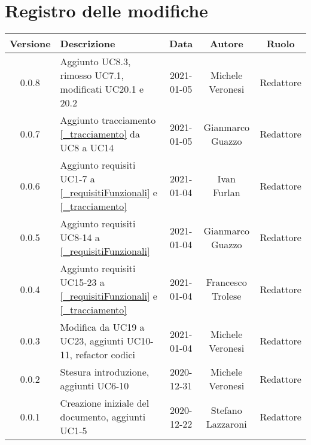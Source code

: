 \section*{Registro delle modifiche}

\begin{center}
	\begin{longtable}{|c|p{5cm}|c|c|c|}
	\hline
	\rowcolor{lighter-grayer}
	\textbf{Versione} & \textbf{Descrizione} & \textbf{Data} & \textbf{Autore} & \textbf{Ruolo} \\
	\hline
	\endfirsthead


	\hline
	0.0.8 & Aggiunto UC8.3, rimosso UC7.1, modificati UC20.1 e 20.2 & 2021-01-05 & Michele Veronesi & Redattore \\
	0.0.7 & Aggiunto tracciamento \ref{_tracciamento} da UC8 a UC14 & 2021-01-05 & Gianmarco Guazzo & Redattore \\
	0.0.6 & Aggiunto requisiti UC1-7 a \ref{_requisitiFunzionali} e \ref{_tracciamento} & 2021-01-04 & Ivan Furlan & Redattore \\
	0.0.5 & Aggiunto requisiti UC8-14 a \ref{_requisitiFunzionali} & 2021-01-04 & Gianmarco Guazzo & Redattore \\
	0.0.4 & Aggiunto requisiti UC15-23 a \ref{_requisitiFunzionali} e \ref{_tracciamento} & 2021-01-04 & Francesco Trolese & Redattore \\
	0.0.3 & Modifica da UC19 a UC23, aggiunti UC10-11, refactor codici & 2021-01-04 & Michele Veronesi & Redattore \\
	0.0.2 & Stesura introduzione, aggiunti UC6-10 & 2020-12-31 & Michele Veronesi & Redattore\\
    0.0.1 & Creazione iniziale del documento, aggiunti UC1-5 & 2020-12-22 & Stefano Lazzaroni & Redattore\\
	\hline

	\end{longtable}
\end{center}